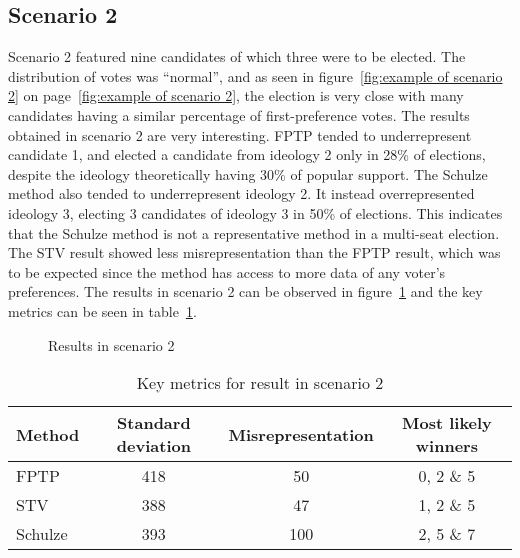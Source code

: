 \documentclass[12pt]{article}
\begin{document}
\subsection{Scenario 2}
\label{sec:resuls-scenario2}
Scenario 2 featured nine candidates of which three were to be elected. The distribution of votes was ``normal'', and as seen in figure~\ref{fig:example of scenario 2} on page~\ref{fig:example of scenario 2}, the election is very close with many candidates having a similar percentage of first-preference votes. The results obtained in scenario 2 are very interesting. FPTP tended to underrepresent candidate 1, and elected a candidate from ideology 2 only in 28\% of elections, despite the ideology theoretically having 30\% of popular support. The Schulze method also tended to underrepresent ideology 2. It instead overrepresented ideology 3, electing 3 candidates of ideology 3 in 50\% of elections. This indicates that the Schulze method is not a representative method in a multi-seat election. The STV result showed less misrepresentation than the FPTP result, which was to be expected since the method has access to more data of any voter's preferences. The results in scenario 2 can be observed in figure~\ref{fig:scenario 2 result} and the key metrics can be seen in table~\ref{tab:scenario 2 result}.
\begin{figure}[H]
	\centering
	\caption{Results in scenario 2}
\label{fig:scenario 2 result}
\end{figure}

\begin{table}[H]
\centering
\caption{Key metrics for result in scenario 2}
\label{tab:scenario 2 result}
\begin{tabular}{@{}lccc@{}}
\toprule
Method & Standard deviation & Misrepresentation & Most likely winners \\ \midrule
FPTP & 418 & 50 & 0, 2 \& 5 \\
STV & 388 & 47 & 1, 2 \& 5 \\
Schulze & 393 & 100 & 2, 5 \& 7  \\ \bottomrule
\end{tabular}
\end{table}
\end{document}
